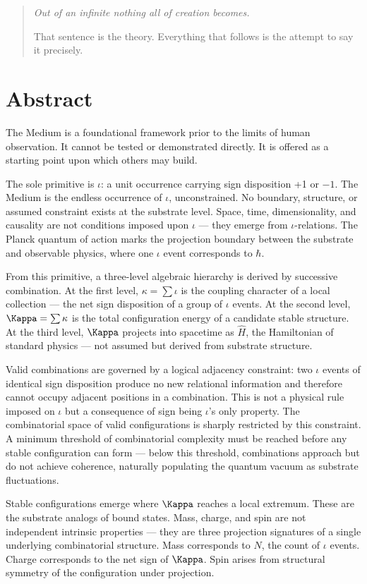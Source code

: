 \documentclass[11pt,letterpaper]{article}
\begin{document}
\begin{quote}
\emph{Out of an infinite nothing all of creation becomes.}

That sentence is the theory. Everything that follows is the attempt to say it precisely.
\end{quote}
\section{Abstract}
\label{sec:orgaecf2c4}

The Medium is a foundational framework prior to the limits of human observation. It cannot be tested or demonstrated directly. It is offered as a starting point upon which others may build.

The sole primitive is \(\iota\): a unit occurrence carrying sign disposition +1 or \(-1\). The Medium is the endless occurrence of \(\iota\), unconstrained. No boundary, structure, or assumed constraint exists at the substrate level. Space, time, dimensionality, and causality are not conditions imposed upon \(\iota\) --- they emerge from \(\iota\)-relations. The Planck quantum of action marks the projection boundary between the substrate and observable physics, where one \(\iota\) event corresponds to \(\hbar\).

From this primitive, a three-level algebraic hierarchy is derived by successive combination. At the first level, \(\kappa = \sum \iota\) is the coupling character of a local collection --- the net sign disposition of a group of \(\iota\) events. At the second level, \(\Kappa = \sum \kappa\) is the total configuration energy of a candidate stable structure. At the third level, \(\Kappa\) projects into spacetime as \(\hat{H}\), the Hamiltonian of standard physics --- not assumed but derived from substrate structure.

Valid combinations are governed by a logical adjacency constraint: two \(\iota\) events of identical sign disposition produce no new relational information and therefore cannot occupy adjacent positions in a combination. This is not a physical rule imposed on \(\iota\) but a consequence of sign being \(\iota\)'s only property. The combinatorial space of valid configurations is sharply restricted by this constraint. A minimum threshold of combinatorial complexity must be reached before any stable configuration can form --- below this threshold, combinations approach but do not achieve coherence, naturally populating the quantum vacuum as substrate fluctuations.

Stable configurations emerge where \(\Kappa\) reaches a local extremum. These are the substrate analogs of bound states. Mass, charge, and spin are not independent intrinsic properties --- they are three projection signatures of a single underlying combinatorial structure. Mass corresponds to \(N\), the count of \(\iota\) events. Charge corresponds to the net sign of \(\Kappa\). Spin arises from structural symmetry of the configuration under projection.
\end{document}
